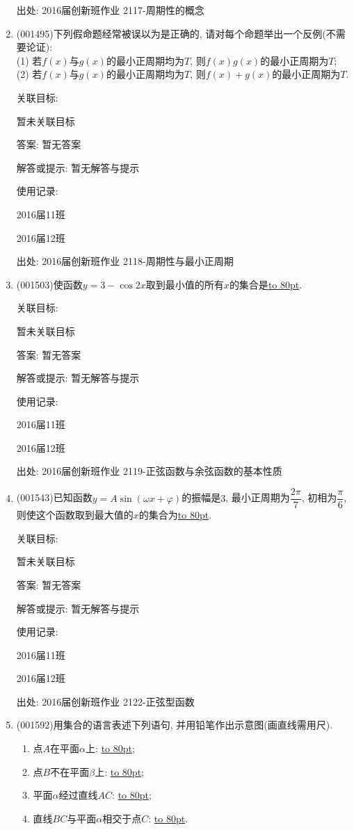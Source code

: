 \documentclass[10pt,a4paper]{article}
\newcommand{\blank}[1]{\underline{\hbox to #1pt{}}}
\begin{document}
\begin{enumerate}[1.]
出处: 2016届创新班作业	2117-周期性的概念
\item { (001495)}下列假命题经常被误以为是正确的, 请对每个命题举出一个反例(不需要论证):\\ 
(1) 若$f(x)$与$g(x)$的最小正周期均为$T$, 则$f(x)g(x)$的最小正周期为$T$;\\ 
(2) 若$f(x)$与$g(x)$的最小正周期均为$T$, 则$f(x)+g(x)$的最小正周期为$T$.


关联目标:

暂未关联目标

答案: 暂无答案

解答或提示: 暂无解答与提示

使用记录:

2016届11班		

2016届12班		


出处: 2016届创新班作业	2118-周期性与最小正周期
\item { (001503)}使函数$y=3-\cos 2x$取到最小值的所有$x$的集合是\blank{80}.


关联目标:

暂未关联目标

答案: 暂无答案

解答或提示: 暂无解答与提示

使用记录:

2016届11班	

2016届12班	


出处: 2016届创新班作业	2119-正弦函数与余弦函数的基本性质
\item { (001543)}已知函数$y=A\sin(\omega x+\varphi)$的振幅是$3$, 最小正周期为$\dfrac{2\pi}{7}$,
初相为$\dfrac{\pi}{6}$, 则使这个函数取到最大值的$x$的集合为\blank{80}.


关联目标:

暂未关联目标

答案: 暂无答案

解答或提示: 暂无解答与提示

使用记录:

2016届11班	

2016届12班	


出处: 2016届创新班作业	2122-正弦型函数
\item { (001592)}用集合的语言表述下列语句, 并用铅笔作出示意图(画直线需用尺).
\begin{enumerate}[(1)]
\item 点$A$在平面$\alpha$上: \blank{80};\\ 
\item 点$B$不在平面$\beta$上: \blank{80};\\ 
\item 平面$\alpha$经过直线$AC$: \blank{80};\\ 
\item 直线$BC$与平面$\alpha$相交于点$C$: \blank{80}.\\ 
\end{enumerate}



\end{enumerate}
\end{document}
